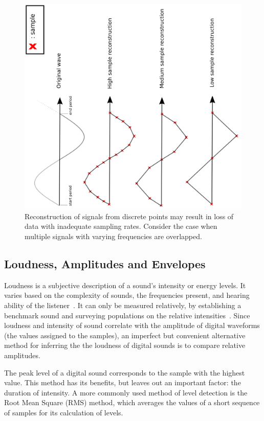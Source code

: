 \documentclass[\main/thesis.tex]{subfiles}
\begin{document}
\begin{figure}[tbp]

\centering
\includegraphics[width=1\linewidth,angle =-90 ]{images/periodic_function_decimation.png}
\caption{Reconstruction of signals from discrete points may result in loss of data with inadequate sampling rates. Consider the case when multiple signals with varying frequencies are overlapped.} 
\label{fig_sampling_rate}
\end{figure}


\subsection{Loudness, Amplitudes and Envelopes}
Loudness is a subjective description of a sound's intensity or energy levels. It varies based on the complexity of sounds, the frequencies present, and hearing ability of the listener~\cite{fletcher1933loudness,cook1999chap6}. It can only be measured relatively, by establishing a benchmark sound and surveying populations on the relative intensities~\cite{cook1999chap6}. Since loudness and intensity of sound correlate with the amplitude of digital waveforms (the values assigned to the samples), an imperfect but convenient alternative method for inferring the the loudness of digital sounds is to compare relative amplitudes. 

The peak level of a digital sound corresponds to the sample with the highest value. This method has its benefits, but leaves out an important factor: the duration of intensity. A more commonly used method of level detection is the Root Mean Square (RMS) method, which averages the values of a short sequence of samples for its calculation of levels.
\end{document}
